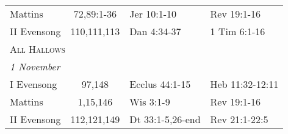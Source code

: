 \begin{longtable}{l c l l}
\hspace{1em} Mattins&72,89:1-36&Jer 10:1-10&Rev 19:1-16\\
\hspace{1em} II Evensong&110,111,113&Dan 4:34-37&1 Tim 6:1-16\\
\multicolumn{4}{l}{\textsc{All Hallows}}\\
\multicolumn{4}{l}{\textit{1 November}}\\
\hspace{1em} I Evensong&97,148&Ecclus 44:1-15&Heb 11:32-12:11\\
\hspace{1em} Mattins&1,15,146&Wis 3:1-9&Rev 19:1-16\\
\hspace{1em} II Evensong&112,121,149&Dt 33:1-5,26-end&Rev 21:1-22:5\\
\end{longtable}

\clearpage
